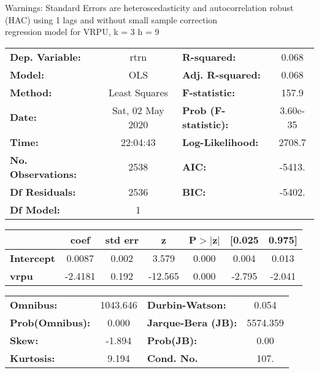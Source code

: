 Warnings: \newline
 [1] Standard Errors are heteroscedasticity and autocorrelation robust (HAC) using 1 lags and without small sample correction\\ 

regression model for VRPU, k = 3 h = 9\begin{center}
\begin{tabular}{lclc}
\toprule
\textbf{Dep. Variable:}    &       rtrn       & \textbf{  R-squared:         } &     0.068   \\
\textbf{Model:}            &       OLS        & \textbf{  Adj. R-squared:    } &     0.068   \\
\textbf{Method:}           &  Least Squares   & \textbf{  F-statistic:       } &     157.9   \\
\textbf{Date:}             & Sat, 02 May 2020 & \textbf{  Prob (F-statistic):} &  3.60e-35   \\
\textbf{Time:}             &     22:04:43     & \textbf{  Log-Likelihood:    } &    2708.7   \\
\textbf{No. Observations:} &        2538      & \textbf{  AIC:               } &    -5413.   \\
\textbf{Df Residuals:}     &        2536      & \textbf{  BIC:               } &    -5402.   \\
\textbf{Df Model:}         &           1      & \textbf{                     } &             \\
\bottomrule
\end{tabular}
\begin{tabular}{lcccccc}
                   & \textbf{coef} & \textbf{std err} & \textbf{z} & \textbf{P$> |$z$|$} & \textbf{[0.025} & \textbf{0.975]}  \\
\midrule
\textbf{Intercept} &       0.0087  &        0.002     &     3.579  &         0.000        &        0.004    &        0.013     \\
\textbf{vrpu}      &      -2.4181  &        0.192     &   -12.565  &         0.000        &       -2.795    &       -2.041     \\
\bottomrule
\end{tabular}
\begin{tabular}{lclc}
\textbf{Omnibus:}       & 1043.646 & \textbf{  Durbin-Watson:     } &    0.054  \\
\textbf{Prob(Omnibus):} &   0.000  & \textbf{  Jarque-Bera (JB):  } & 5574.359  \\
\textbf{Skew:}          &  -1.894  & \textbf{  Prob(JB):          } &     0.00  \\
\textbf{Kurtosis:}      &   9.194  & \textbf{  Cond. No.          } &     107.  \\
\bottomrule
\end{tabular}
\end{center}

